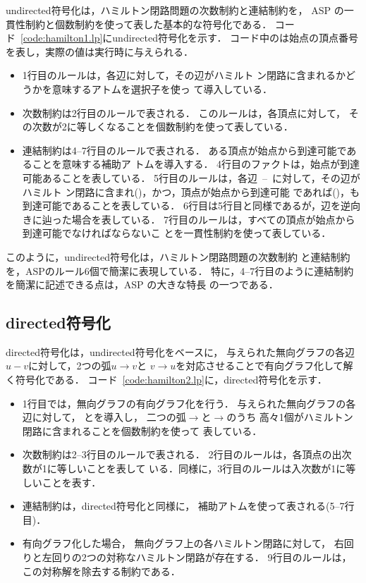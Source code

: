 \textsf{undirected}符号化は，ハミルトン閉路問題の次数制約と連結制約を，
ASP の一貫性制約と個数制約を使って表した基本的な符号化である．
コード~\ref{code:hamilton1.lp}に\textsf{undirected}符号化を示す．
コード中のは始点の頂点番号を表し，実際の値は実行時に与えられる．
\begin{itemize}
\item 1行目のルールは，各辺に対して，その辺がハミルト
  ン閉路に含まれるかどうかを意味するアトムを選択子を使っ
  て導入している．
\item 次数制約は2行目のルールで表される．
  このルールは，各頂点に対して，
  その次数が2に等しくなることを個数制約を使って表している．
\item 連結制約は4--7行目のルールで表される．
  ある頂点が始点から到達可能であることを意味する補助ア
  トムを導入する．
  4行目のファクトは，始点が到達可能あることを表している．
  5行目のルールは，各辺~--~に対して，その辺がハミルト
  ン閉路に含まれ()，かつ，頂点が始点から到達可能
  であれば()，も到達可能であることを表している．
  6行目は5行目と同様であるが，辺を逆向きに辿った場合を表している．
  7行目のルールは，すべての頂点が始点から到達可能でなければならないこ
  とを一貫性制約を使って表している．
\end{itemize}
このように，\textsf{undirected}符号化は，ハミルトン閉路問題の次数制約
と連結制約を，ASPのルール6個で簡潔に表現している．
特に，4--7行目のように連結制約を簡潔に記述できる点は，ASP の大きな特長
の一つである．

\subsection{\textsf{directed}符号化}

\textsf{directed}符号化は，\textsf{undirected}符号化をベースに，
与えられた無向グラフの各辺$u-v$に対して，2つの弧$u\rightarrow v$と
$v\rightarrow u$を対応させることで有向グラフ化して解く符号化である．
コード~\ref{code:hamilton2.lp}に，\textsf{directed}符号化を示す．
\begin{itemize}
\item 1行目では，無向グラフの有向グラフ化を行う．
  与えられた無向グラフの各辺に対して，
  とを導入し，
  二つの弧$\rightarrow$と$\rightarrow$のうち
  高々1個がハミルトン閉路に含まれることを個数制約を使って
  表している．
\item 次数制約は2--3行目のルールで表される．
  2行目のルールは，各頂点の出次数が1に等しいことを表して
  いる．同様に，3行目のルールは入次数が1に等しいことを表す．
\item 連結制約は，\textsf{directed}符号化と同様に，
  補助アトムを使って表される(5--7行目)．
\item 有向グラフ化した場合，
  無向グラフ上の各ハミルトン閉路に対して，
  右回りと左回りの2つの対称なハミルトン閉路が存在する．
  9行目のルールは，この対称解を除去する制約である．
\end{itemize}

